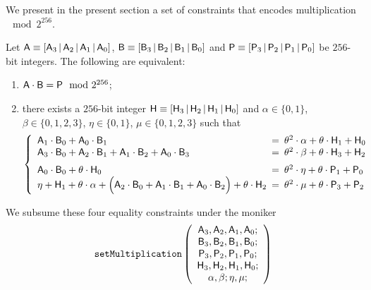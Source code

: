 We present in the present section a set of constraints \setMultiplication{} that encodes multiplication $\mod 2^{256}$.
\begin{lem}
Let 
$\textsf{A}\equiv[\textsf{A}_{3} \,|\, \textsf{A}_{2} \,|\, \textsf{A}_{1} \,|\, \textsf{A}_{0}]$,
$\textsf{B}\equiv[\textsf{B}_{3} \,|\, \textsf{B}_{2} \,|\, \textsf{B}_{1} \,|\, \textsf{B}_{0}]$
and
$\textsf{P} \equiv [\textsf{P}_{3} \,|\, \textsf{P}_{2} \,|\, \textsf{P}_{1} \,|\, \textsf{P}_{0}]$
be $256$-bit integers. The following are equivalent:
\begin{enumerate}
	\item $\textsf{A} \cdot \textsf{B} = \textsf{P} \mod 2^{256}$;
	\item there exists a $256$-bit integer $\textsf{H} \equiv [\textsf{H}_{3} \,|\, \textsf{H}_{2} \,|\, \textsf{H}_{1} \,|\, \textsf{H}_{0}]$
	and $\alpha \in \{ 0, 1 \}$,
	$\beta \in \{ 0, 1, 2, 3 \}$,
	$\eta \in \{ 0, 1 \}$,
	$\mu \in \{ 0, 1, 2, 3 \}$ such that
	\[
		\left\{
		\begin{array}{lcl}
			  \col{A}_{1} \cdot \col{B}_{0}
			+ \col{A}_{0} \cdot \col{B}_{1}
			& \!\!\! = \!\!\! &
			\theta^2 \cdot \alpha
			+ \theta \cdot \col{H}_{1}
			+ \col{H}_{0}
			\\
			  \col{A}_{3} \cdot \col{B}_{0}
			+ \col{A}_{2} \cdot \col{B}_{1}
			+ \col{A}_{1} \cdot \col{B}_{2}
			+ \col{A}_{0} \cdot \col{B}_{3}
			& \!\!\! = \!\!\! &
			\theta^2 \cdot \beta
			+ \theta \cdot \col{H}_{3}
			+ \col{H}_{2}
			\vspace{2mm} \\
			\col{A}_{0} \cdot \col{B}_{0}
			+ \theta \cdot \col{H}_{0}
			& \!\!\! = \!\!\! &
			\theta^2 \cdot \eta
			+ \theta \cdot \col{P}_{1}
			+ \col{P}_{0}
			\\
			\eta
			+ \col{H}_{1}
			+ \theta \cdot \alpha
			+ \Big(
			  \col{A}_{2} \cdot \col{B}_{0}
			+ \col{A}_{1} \cdot \col{B}_{1}
			+ \col{A}_{0} \cdot \col{B}_{2} \Big)
			+ \theta \cdot \col{H}_{2}
			& \!\!\! = \!\!\! &
			\theta^2 \cdot \mu
			+ \theta \cdot \col{P}_{3}
			+ \col{P}_{2}
			\\
		\end{array}
		\right.
	\]
\end{enumerate}
\end{lem}
We subsume these four equality constraints under the moniker
\[
	\texttt{setMultiplication}
	\left(
	\begin{array}{c}
		\textsf{A}_{3},
		\textsf{A}_{2},
		\textsf{A}_{1},
		\textsf{A}_{0}; \\
		\textsf{B}_{3},
		\textsf{B}_{2},
		\textsf{B}_{1},
		\textsf{B}_{0}; \\
		\textsf{P}_{3},
		\textsf{P}_{2},
		\textsf{P}_{1},
		\textsf{P}_{0}; \\
		\textsf{H}_{3},
		\textsf{H}_{2},
		\textsf{H}_{1},
		\textsf{H}_{0}; \\
		\alpha, \beta; \eta, \mu; \\
	\end{array}
	\right)
\]
